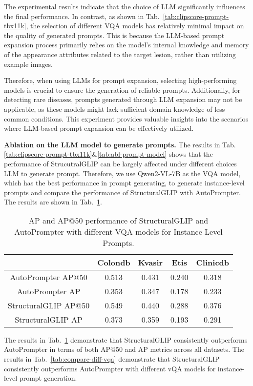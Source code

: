 The experimental results indicate that the choice of LLM significantly influences the final performance. In contrast, as shown in Tab.~\ref{tab:clipscore-prompt-tbx11k}, the selection of different VQA models has relatively minimal impact on the quality of generated prompts. This is because the LLM-based prompt expansion process primarily relies on the model's internal knowledge and memory of the appearance attributes related to the target lesion, rather than utilizing example images.

Therefore, when using LLMs for prompt expansion, selecting high-performing models is crucial to ensure the generation of reliable prompts. Additionally, for detecting rare diseases, prompts generated through LLM expansion may not be applicable, as these models might lack sufficient domain knowledge of less common conditions. This experiment provides valuable insights into the scenarios where LLM-based prompt expansion can be effectively utilized.


\textbf{Ablation on the LLM model to generate prompts.} The results in Tab.\ref{tab:clipscore-prompt-tbx11k}\&\ref{tab:abl-prompt-model} shows that the performance of StrucutralGLIP can be largely affected under different choices LLM to generate prompt. Therefore, we use Qwen2-VL-7B as the VQA model, which has the best performance in prompt generating, to generate instance-level prompts and compare the performance of StructuralGLIP with AutoPrompter. The results are shown in Tab.~\ref{tab:compare-qwen2-vl}.

\begin{table}[ht]
\centering
\caption{AP and AP@50 performance of StructuralGLIP and AutoPrompter with different VQA models for Instance-Level Prompts.}
\label{tab:compare-qwen2-vl}
\begin{tabular}{ccccc}
\toprule
\textbf{} & {Colondb} & {Kvasir} & {Etis} & {Clinicdb} \\
\toprule
{AutoPrompter AP@50} & 0.513 & 0.431 & 0.240 & 0.318 \\
{AutoPrompter AP} & 0.353 & 0.347 & 0.178 & 0.233 \\

{StructuralGLIP AP@50} & 0.549 & 0.440 & 0.288 & 0.376 \\
{StructuralGLIP AP} & 0.373 & 0.359 & 0.193 & 0.291 \\
\bottomrule
\end{tabular}
\end{table}

The results in Tab.~\ref{tab:compare-qwen2-vl} demonstrate that StructuralGLIP consistently outperforms AutoPrompter in terms of both AP@50 and AP metrics across all datasets. The results in Tab.~\ref{tab:compare-diff-vqa} demonstrate that StructuralGLIP consistently outperforms AutoPrompter with different vQA models for instance-level prompt generation.

